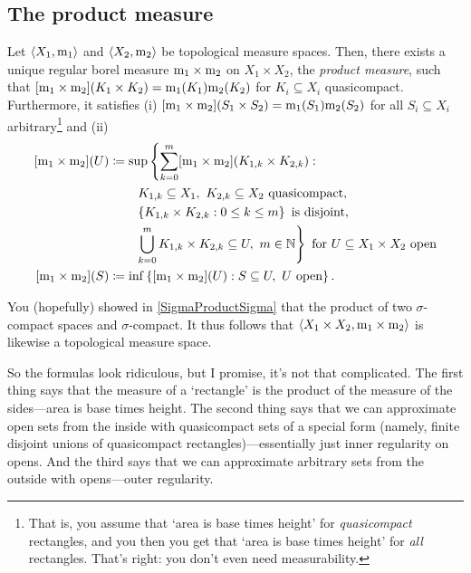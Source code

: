 \subsection{The product measure}

\begin{thm}
Let $\langle X_1,\mathrm{m} _1\rangle$ and $\langle X_2,\mathrm{m} _2\rangle$ be topological measure spaces.  Then, there exists a unique regular borel measure $\mathrm{m} _1\times \mathrm{m} _2$ on $X_1\times X_2$, the \emph{product measure}, such that $[\mathrm{m} _1\times \mathrm{m} _2](K_1\times K_2)=\mathrm{m} _1(K_1)\mathrm{m} _2(K_2)$ for $K_i\subseteq X_i$ quasicompact.  Furthermore, it satisfies (i) $[\mathrm{m} _1\times \mathrm{m} _2](S_1\times S_2)=\mathrm{m} _1(S_1)\mathrm{m} _2(S_2)$ for all $S_i\subseteq X_i$ arbitrary\footnote{That is, you assume that `area is base times height' for \emph{quasicompact} rectangles, and you then you get that `area is base times height' for \emph{all} rectangles.  That's right:  you don't even need measurability.} and (ii)
\begin{equation}
\begin{split}
[\meas _1\times \meas _2](U) & \coloneqq \sup \left\{ \sum _{k=0}^m[\meas _1\times \meas _2](K_{1,k}\times K_{2,k}):\right. \\
& \qquad \left. K_{1,k}\subseteq X_1,\ K_{2,k}\subseteq X_2\text{ quasicompact},\right. \\
& \qquad \left. \left\{ K_{1,k}\times K_{2,k}:0\leq k\leq m\right\} \text{ is disjoint},\right. \\
& \qquad \left. \bigcup _{k=0}^mK_{1,k}\times K_{2,k}\subseteq U,\ m\in \N \right\} \text{ for }U\subseteq X_1\times X_2\text{ open} \\
[\meas _1\times \meas _2](S) & \coloneqq \inf \left\{ [\meas _1\times \meas _2](U):S\subseteq U,\ U\text{ open}\right\} .
\end{split}
\end{equation}
\begin{rmk}
You (hopefully) showed in \cref{SigmaProductSigma} that the product of two $\sigma$-compact spaces and $\sigma$-compact.  It thus follows that $\langle X_1\times X_2,\mathrm{m} _1\times \mathrm{m} _2\rangle$ is likewise a topological measure space.
\end{rmk}
\begin{rmk}
So the formulas look ridiculous, but I promise, it's not that complicated.  The first thing says that the measure of a `rectangle' is the product of the measure of the sides---area is base times height.  The second thing says that we can approximate open sets from the inside with quasicompact sets of a special form (namely, finite disjoint unions of quasicompact rectangles)---essentially just inner regularity on opens.  And the third says that we can approximate arbitrary sets from the outside with opens---outer regularity.

\end{rmk}
\end{thm}
